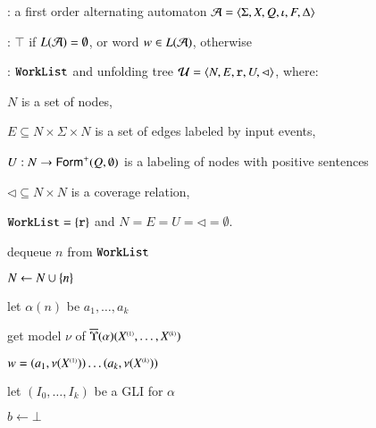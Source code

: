 \begin{algorithm}[t!]
{\footnotesize\begin{algorithmic}[0] : a first order
  alternating automaton $\mathcal{A} = \langle \Sigma,X,Q,\iota,F,\Delta \rangle$
  
  : $\top$ if $L(\mathcal{A})=\emptyset$, or word $w \in
  L(\mathcal{A})$, otherwise

  : $\mathtt{WorkList}$ and unfolding tree
  $\mathcal{U} = \langle N,E,\mathtt{r},U,\lhd \rangle$,
  where: \begin{compactitem}
  \item $N$ is a set of nodes,
  \item $E \subseteq N \times \Sigma \times N$ is a set of edges labeled by input events,
  \item $U : N \rightarrow \mathsf{Form}^+(Q,\emptyset)$ is a labeling of
    nodes with positive sentences
  \item $\lhd \subseteq N \times N$ is a coverage relation,
  \end{compactitem}  

   $\mathtt{WorkList} = \{ \mathtt{r} \}$ and
  $N=E=U=\lhd=\emptyset$.
\end{algorithmic}}
{\footnotesize\begin{algorithmic}[1]   
  \While{$\worklist \neq \emptyset$}
  \label{ln:impact-while}

  \State dequeue $n$ from $\mathtt{WorkList}$ 
  \label{ln:impact-dequeue}

  \State $N \leftarrow N \cup \{ n \}$

  \State let $\alpha(n)$ be $a_1, \ldots, a_k$


  \State get model $\nu$ of $\overline{\Upsilon}({\alpha})({X}^{\scriptscriptstyle{({1})}}, \ldots, {X}^{\scriptscriptstyle{({k})}})$

   $w = (a_1,\nu({X}^{\scriptscriptstyle{({1})}})) \ldots (a_k,\nu({X}^{\scriptscriptstyle{({k})}}))$
  \label{ln:impact-nonempty}

  \Else {}

  \State let $(I_0,\ldots,I_k)$ be a GLI for $\alpha$
  \label{ln:refine-begin}

  \State $b \leftarrow \bot$




\end{algorithmic}}
\end{algorithm}
